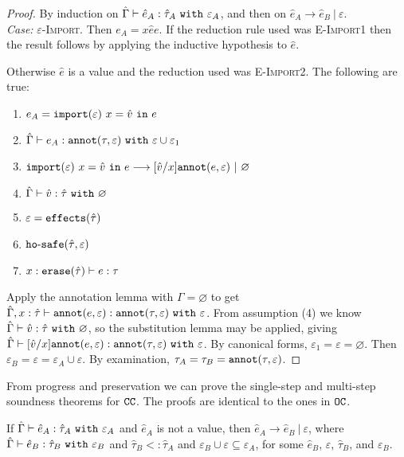 \begin{proof} By induction on $\hat \Gamma \vdash \hat e_A: \hat \tau_A~\mathtt{with}~ \varepsilon_A$, and then on $\hat e_A \longrightarrow \hat e_B~|~\varepsilon$. \\

\textit{Case:} \textsc{$\varepsilon$-Import}. Then $e_A = {x}{\hat e}{e}$. If the reduction rule used was \textsc{E-Import1} then the result follows by applying the inductive hypothesis to $\hat e$.

Otherwise $\hat e$ is a value and the reduction used was \textsc{E-Import2}. The following are true:
\begin{enumerate}
	\item $e_A = \mathtt{import}(\varepsilon)~x = \hat v~\mathtt{in}~ e$
	\item $\hat \Gamma \vdash e_A: \mathtt{annot}(\tau, \varepsilon)~\mathtt{with}~ \varepsilon \cup \varepsilon_1$
	\item $\mathtt{import}(\varepsilon)~x = \hat v~\mathtt{in}~ e \longrightarrow [\hat v/x]\mathtt{annot}(e, \varepsilon)~|~\varnothing$
	\item $\hat \Gamma \vdash \hat v: \hat \tau~\mathtt{with}~ \varnothing$
	\item $\varepsilon = \mathtt{effects}(\hat \tau)$
	\item $\mathtt{ho \hbox{-} safe}(\hat \tau, \varepsilon)$
	\item $x: \mathtt{erase}(\hat \tau) \vdash e: \tau$
\end{enumerate}

\noindent
Apply the annotation lemma with $\Gamma = \varnothing$ to get $\hat \Gamma, x: \hat \tau \vdash \mathtt{annot}(e, \varepsilon): \mathtt{annot}(\tau, \varepsilon)~\mathtt{with}~ \varepsilon$. From assumption (4) we know $\hat \Gamma \vdash \hat v: \hat \tau~\mathtt{with}~ \varnothing$, so the substitution lemma may be applied, giving $\hat \Gamma \vdash [\hat v/x]\mathtt{annot}(e, \varepsilon): \mathtt{annot}(\tau, \varepsilon)~\mathtt{with}~ \varepsilon$. By canonical forms, $\varepsilon_1 = \varepsilon = \varnothing$. Then $\varepsilon_B = \varepsilon = \varepsilon_A \cup \varepsilon$. By examination, $\tau_A = \tau_B = \mathtt{annot}(\tau, \varepsilon)$.
\end{proof}

From progress and preservation we can prove the single-step and multi-step soundness theorems for $\mathtt{CC}$. The proofs are identical to the ones in $\mathtt{OC}$.

\begin{theorem}
If $\hat \Gamma \vdash \hat e_A: \hat \tau_A~\mathtt{with}~ \varepsilon_A$ and $\hat e_A$ is not a value, then $\hat e_A \longrightarrow \hat e_B~|~\varepsilon$, where $\hat \Gamma \vdash \hat e_B: \hat \tau_B~\mathtt{with}~ \varepsilon_B$ and $\hat \tau_B <: \hat \tau_A$ and $\varepsilon_B \cup \varepsilon \subseteq \varepsilon_A$, for some $\hat e_B$, $\varepsilon$, $\hat \tau_B$, and $\varepsilon_B$.
\end{theorem}

